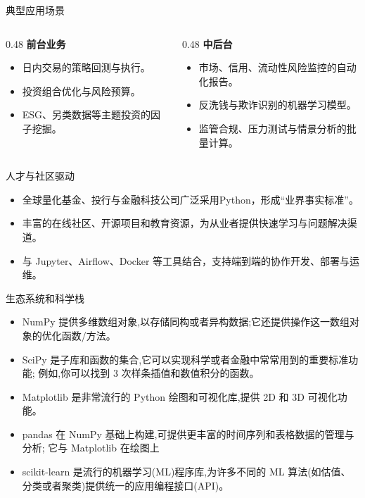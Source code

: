 \documentclass[9pt]{ctexbeamer}
\begin{document}
\begin{frame}{典型应用场景}
    \begin{columns}[T,totalwidth=\textwidth]
        \begin{column}{0.48\textwidth}
            \textbf{前台业务}
            \begin{itemize}
                \item 日内交易的策略回测与执行。
                \item 投资组合优化与风险预算。
                \item ESG、另类数据等主题投资的因子挖掘。
            \end{itemize}
        \end{column}
        \begin{column}{0.48\textwidth}
            \textbf{中后台}
            \begin{itemize}
                \item 市场、信用、流动性风险监控的自动化报告。
                \item 反洗钱与欺诈识别的机器学习模型。
                \item 监管合规、压力测试与情景分析的批量计算。
            \end{itemize}
        \end{column}
    \end{columns}
\end{frame}

\begin{frame}{人才与社区驱动}
    \begin{itemize}
        \item 全球量化基金、投行与金融科技公司广泛采用Python，形成“业界事实标准”。
        \item 丰富的在线社区、开源项目和教育资源，为从业者提供快速学习与问题解决渠道。
        \item 与 Jupyter、Airflow、Docker 等工具结合，支持端到端的协作开发、部署与运维。
    \end{itemize}
\end{frame}




\begin{frame}{生态系统和科学栈}
	\begin{itemize}
		\item NumPy 提供多维数组对象,以存储同构或者异构数据;它还提供操作这一数组对 象的优化函数/方法。  \item SciPy 是子库和函数的集合,它可以实现科学或者金融中常常用到的重要标准功能; 例如,你可以找到 3 次样条插值和数值积分的函数。
		\item Matplotlib 是非常流行的 Python 绘图和可视化库,提供 2D 和 3D 可视化功能。
		\item pandas 在 NumPy 基础上构建,可提供更丰富的时间序列和表格数据的管理与分析; 它与 Matplotlib 在绘图上
		\item scikit-learn 是流行的机器学习(ML)程序库,为许多不同的 ML 算法(如估值、 分类或者聚类)提供统一的应用编程接口(API)。
	\end{itemize}
	
\end{frame}
\end{document}
